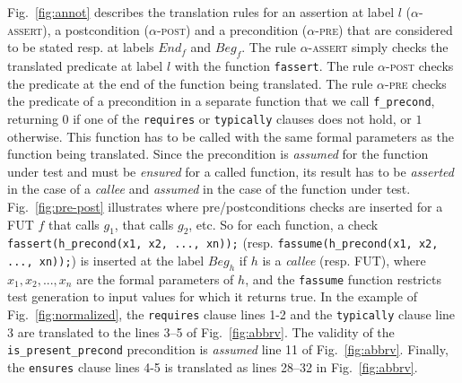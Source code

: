 Fig.~\ref{fig:annot} describes the translation rules for an assertion at label $l$
(\textsc{$\alpha$-assert}), a postcondition (\textsc{$\alpha$-post}) and
a precondition (\textsc{$\alpha$-pre})
that are considered to be stated resp. at labels $End_f$ and $Beg_f$. 
The rule \textsc{$\alpha$-assert}
simply checks the translated predicate at label $l$ with the function
\lstinline|fassert|. The rule \textsc{$\alpha$-post} checks the predicate at
the end of the function being translated. The rule \textsc{$\alpha$-pre} checks
the predicate of a precondition in a separate function that we call
\lstinline'f_precond', returning $0$ if one of the \lstinline|requires| or
\lstinline|typically| clauses does not hold, or $1$ otherwise. This function
has to be called with the same formal parameters as the function
being translated.
Since the precondition is \emph{assumed} for the function under test
and must be \emph{ensured} for a called function,
its result has to be {\em asserted} in the case
of a {\em callee}  and {\em assumed} in the case of the function under
test. 
Fig.~\ref{fig:pre-post} illustrates where
pre/postconditions checks are inserted for a FUT $f$ that calls $g_1$, that 
calls $g_2$, etc. 
So for each function, a check 
\lstinline|fassert(h_precond(x1, x2, ..., xn));| (resp.
\lstinline|fassume(h_precond(x1, x2, ..., xn));|) is inserted at the label
$Beg_h$ if $h$ is a {\em callee} (resp. FUT), where
$x_1, x_2, ..., x_n$ are the formal parameters of $h$, and
the \lstinline|fassume| function restricts 
test generation to input values for which it returns true.
In the example of Fig.~\ref{fig:normalized}, the
\lstinline|requires| clause lines 1-2 and the \lstinline|typically| clause line
3 are translated to the lines 3--5 of Fig.~\ref{fig:abbrv}. The validity of the
\lstinline'is_present_precond' precondition is {\em assumed} line 11 of
Fig.~\ref{fig:abbrv}. Finally, the \lstinline|ensures| clause lines 4-5 is
translated as lines 28--32 in Fig.~\ref{fig:abbrv}. 



